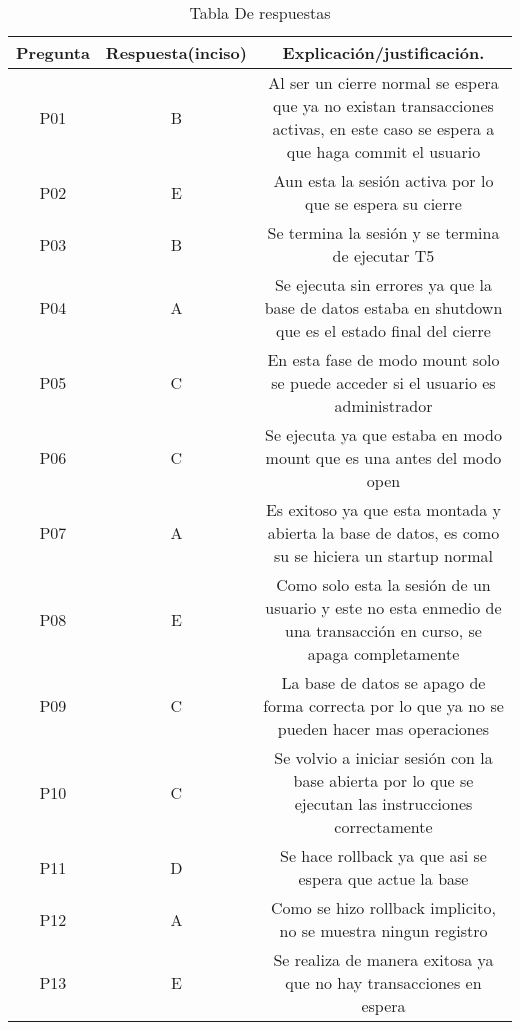 \documentclass[journal]{IEEEtran}
\begin{document}
\begin{table}[H]
  \centering
  \begin{tabular}{||c |c| c||} 
   \hline
   Pregunta & Respuesta(inciso) &Explicación/justificación.\\ [1.0ex] 
   \hline
   P01 & B & Al ser un cierre normal se espera que ya no existan transacciones activas, en este caso se espera a que haga commit el usuario \\ \hline
   P02 & E & Aun esta la sesión activa por lo que se espera su cierre \\ \hline
   P03 & B & Se termina la sesión y se termina de ejecutar T5 \\ \hline
   P04 & A & Se ejecuta sin errores ya que la base de datos estaba en shutdown que es el estado final del cierre \\ \hline
   P05 & C & En esta fase de modo mount solo se puede acceder si el usuario es administrador \\ \hline
   P06 & C & Se ejecuta ya que estaba en modo mount que es una antes del modo open \\ \hline
   P07 & A & Es exitoso ya que esta montada y abierta la base de datos, es como su se hiciera un startup normal \\ \hline
   P08 & E & Como solo esta la sesión de un usuario y este no esta enmedio de una transacción en curso, se apaga completamente\\ \hline
   P09 & C & La base de datos se apago de forma correcta por lo que ya no se pueden hacer mas operaciones \\ \hline
   P10 & C & Se volvio a iniciar sesión con la base abierta por lo que se ejecutan las instrucciones correctamente \\ \hline
   P11 & D & Se hace rollback ya que asi se espera que actue la base \\ \hline
   P12 & A & Como se hizo rollback implicito, no se muestra ningun registro \\ \hline
   P13 & E & Se realiza de manera exitosa ya que no hay transacciones en espera \\  [1ex] 
   \hline
  \end{tabular}
  \caption{Tabla De respuestas}
  \label{tabla:1}
  \end{table}
\end{document}
